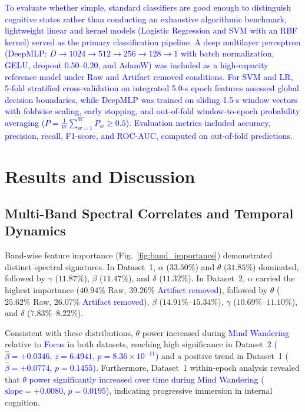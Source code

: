 \documentclass[conference]{IEEEtran}
\begin{document}
\textcolor{blue}{To evaluate whether simple, standard classifiers are good enough to distinguish cognitive states rather than conducting an exhaustive algorithmic benchmark, lightweight linear and kernel models (Logistic Regression and SVM with an RBF kernel) served as the primary classification pipeline. A deep multilayer perceptron (DeepMLP: $D \rightarrow 1024 \rightarrow 512 \rightarrow 256 \rightarrow 128 \rightarrow 1$ with batch normalization, GELU, dropout $0.50$--$0.20$, and AdamW) was included as a high-capacity reference model under Raw and Artifact removed conditions. For SVM and LR, 5-fold stratified cross-validation on integrated 5.0-s epoch features assessed global decision boundaries, while DeepMLP was trained on sliding 1.5-s window vectors with foldwise scaling, early stopping, and out-of-fold window-to-epoch probability averaging ($P = \frac{1}{W}\sum_{w=1}^W P_w \ge 0.5$). Evaluation metrics included accuracy, precision, recall, F1-score, and ROC-AUC, computed on out-of-fold predictions.}



\section{Results and Discussion}

\subsection{Multi-Band Spectral Correlates and Temporal Dynamics}

Band-wise feature importance (Fig.~\ref{fig:band_importance}) demonstrated distinct spectral signatures. In Dataset~1, $\alpha$ ($33.50\%$) and $\theta$ ($31.85\%$) dominated, followed by $\gamma$ ($11.87\%$), $\beta$ ($11.47\%$), and $\delta$ ($11.32\%$). In Dataset~2, $\alpha$ carried the highest importance ($40.94\%$ Raw, $39.26\%$ \textcolor{blue}{Artifact removed}), followed by $\theta$ ($25.62\%$ Raw, $26.07\%$ \textcolor{blue}{Artifact removed}), $\beta$ ($14.91\%$--$15.34\%$), $\gamma$ ($10.69\%$--$11.10\%$), and $\delta$ ($7.83\%$--$8.22\%$).

Consistent with these distributions, $\theta$ power increased during \textcolor{blue}{Mind Wandering} relative to \textcolor{blue}{Focus} in both datasets, reaching high significance in Dataset~2 \textcolor{blue}{($\hat{\beta} = +0.0346$, $z = 6.4941$, $p = 8.36\times 10^{-11}$)} and a positive trend in Dataset~1 \textcolor{blue}{($\hat{\beta} = +0.0774$, $p = 0.1455$)}. Furthermore, Dataset~1 within-epoch analysis revealed that \textcolor{blue}{$\theta$ power significantly increased over time during Mind Wandering ($\text{slope} = +0.0080$, $p = 0.0195$)}, indicating progressive immersion in internal cognition.
\end{document}

